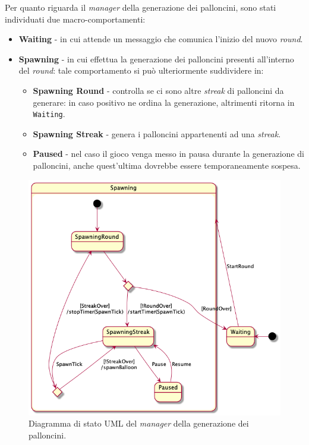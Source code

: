 Per quanto riguarda il \textit{manager} della generazione dei palloncini, sono stati individuati due
macro-comportamenti:
\begin{itemize}
    \item \textbf{Waiting} - in cui attende un messaggio che comunica l'inizio del nuovo \textit{round}.
    \item \textbf{Spawning} - in cui effettua la generazione dei palloncini presenti all'interno del \textit{round}:
    tale comportamento si può ulteriormente suddividere in:
    \begin{itemize}
        \item \textbf{Spawning Round} - controlla se ci sono altre \textit{streak} di palloncini da generare: in caso
        positivo ne ordina la generazione, altrimenti ritorna in \texttt{Waiting}.
        \item \textbf{Spawning Streak} - genera i palloncini appartenenti ad una \textit{streak}.
        \item \textbf{Paused} - nel caso il gioco venga messo in pausa durante la generazione di palloncini, anche
        quest'ultima dovrebbe essere temporaneamente sospesa.
    \end{itemize}
\end{itemize}

\begin{figure}[H]
    \centering
    \includegraphics[width=.8\linewidth]{img/state-spawn-manager}
    \caption{Diagramma di stato UML del \textit{manager} della generazione dei palloncini.}
    \label{fig:spawn-manager}
\end{figure}

